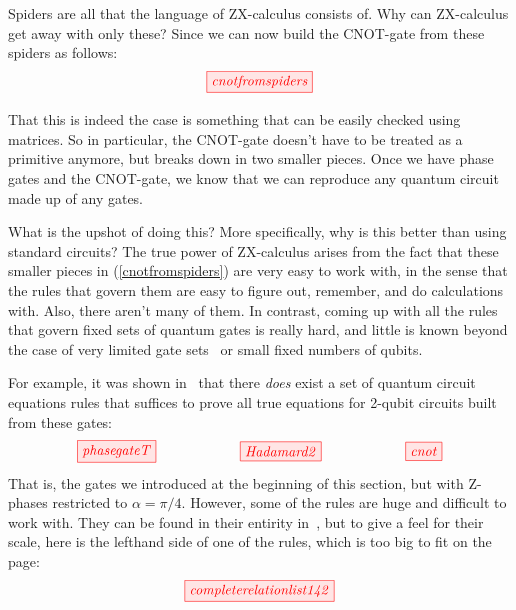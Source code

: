 \documentclass[11pt]{article}
\theoremstyle{definition}
\newcommand{\beq}{\begin{equation}}
\newcommand{\eeq}{\end{equation}\par\noindent}
\begin{document}
Spiders are all that the language of ZX-calculus consists of. Why can ZX-calculus get away with only these? 
Since we can now build the CNOT-gate from these spiders as follows:
\beq\label{cnotfromspiders}
\tikzfig{cnotfromspiders}
\eeq
That this is indeed the case is something that can be easily checked using matrices.  So in particular, the CNOT-gate doesn't have to be treated as a primitive anymore, but breaks down in two smaller pieces. Once we have phase gates and the CNOT-gate, we know that we can reproduce any quantum circuit made up of any gates.

What is the upshot of doing this?  More specifically, why is this better than using standard circuits?
The true power of ZX-calculus arises from the fact that these smaller pieces in (\ref{cnotfromspiders}) are very easy to work with, in the sense that the rules that govern them  are easy  to figure out, remember, and do calculations with.  Also, there aren't many of them.  In contrast, coming up with all the rules that govern fixed sets of quantum gates is really hard, and little is known beyond the case of very limited gate sets~\cite{cnotdihedral} or small fixed numbers of qubits.

For example, it was shown in~\cite{ptbian} that there \textit{does} exist a set of quantum circuit equations rules that suffices to prove all true equations for 2-qubit circuits built from these gates:
\[
\tikzfig{phasegateT}\qquad\qquad\qquad\tikzfig{Hadamard2}\qquad\qquad\qquad\tikzfig{cnot}  
\]
That is, the gates we introduced at the beginning of this section, but with Z-phases restricted to $\alpha = \pi/4$.
However, some of the rules are huge and difficult to work with. They can be found in their entirity in~\cite{DBLP:conf/rc/CoeckeW18}, but to give a feel for their scale, here is the lefthand side of one of the rules, which is too big to fit on the page:
\beq\label{circ:completerelationlist142}
\tikzfig{completerelationlist142} 
\eeq


\end{document}
